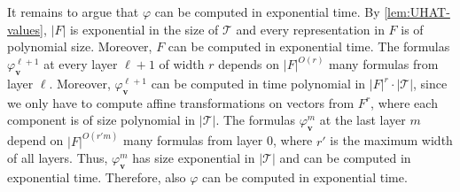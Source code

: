 It remains to argue that $\varphi$ can be computed in exponential time.
By \cref{lem:UHAT-values}, $|F|$ is exponential in the size of $\mathcal{T}$ 
and every representation in $F$ is of polynomial size.
Moreover, $F$ can be computed in exponential time.
The formulas $\varphi_{\bm v}^{\ell+1}$ at every layer $\ell+1$ of width $r$
depends on $|F|^{O(r)}$ many formulas from layer $\ell$.
Moreover, $\varphi_{\bm v}^{\ell+1}$ can be computed in time polynomial in $|F|^r \cdot |\mathcal{T}|$,
since we only have to compute affine transformations on vectors from $F^r$,
where each component is of size polynomial in $|\mathcal{T}|$.
The formulas $\varphi_{\bm v}^{m}$ at the last layer $m$ depend on $|F|^{O(r'm)}$ many formulas from layer 0,
where $r'$ is the maximum width of all layers.
Thus, $\varphi_{\bm v}^{m}$ has size exponential in $|\mathcal{T}|$ and can be computed in exponential time.
Therefore, also $\varphi$ can be computed in exponential time.